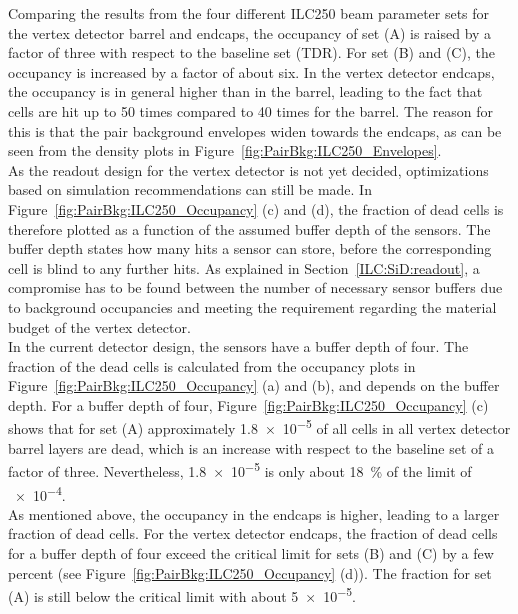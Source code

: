 Comparing the results from the four different ILC250 beam parameter sets for the vertex detector barrel and endcaps, the occupancy of set (A) is raised by a factor of three with respect to the baseline set (TDR).
For set (B) and (C), the occupancy is increased by a factor of about six.
In the vertex detector endcaps, the occupancy is in general higher than in the barrel, leading to the fact that cells are hit up to 50 times compared to 40 times for the barrel.
The reason for this is that the pair background envelopes widen towards the endcaps, as can be seen from the density plots in Figure~\ref{fig:PairBkg:ILC250_Envelopes}.
\\As the readout design for the vertex detector is not yet decided, optimizations based on simulation recommendations can still be made.
In Figure~\ref{fig:PairBkg:ILC250_Occupancy} (c) and (d), the fraction of dead cells is therefore plotted as a function of the assumed buffer depth of the sensors.
The buffer depth states how many hits a sensor can store, before the corresponding cell is blind to any further hits.
As explained in Section~\ref{ILC:SiD:readout}, a compromise has to be found between the number of necessary sensor buffers due to background occupancies and meeting the \sid requirement regarding the material budget of the vertex detector.
\\In the current detector design, the sensors have a buffer depth of four. 
The fraction of the dead cells is calculated from the occupancy plots in Figure~\ref{fig:PairBkg:ILC250_Occupancy} (a) and (b), and depends on the buffer depth.
For a buffer depth of four, Figure~\ref{fig:PairBkg:ILC250_Occupancy} (c) shows that for set (A) approximately \num{1.8e-5} of all cells in all vertex detector barrel layers are dead, which is an increase with respect to the baseline set of a factor of three.
Nevertheless, \num{1.8e-5} is only about \SI{18}{\percent} of the limit of \num{e-4}.
\\As mentioned above, the occupancy in the endcaps is higher, leading to a larger fraction of dead cells.
For the vertex detector endcaps, the fraction of dead cells for a buffer depth of four exceed the critical limit for sets (B) and (C) by a few percent (see Figure~\ref{fig:PairBkg:ILC250_Occupancy} (d)).
The fraction for set (A) is still below the critical limit with about \num{5e-5}.\\
